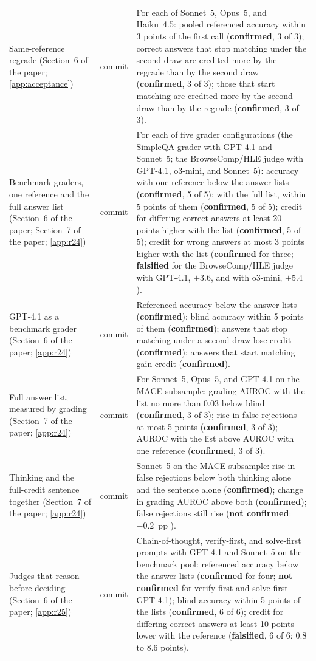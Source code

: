 {\begin{longtable}{L{3.2cm}L{1.1cm}L{8.7cm}}
Same-reference regrade (Section~6 of the paper; \cref{app:acceptance}) & commit & For each of Sonnet~5, Opus~5, and Haiku~4.5: pooled referenced accuracy within 3 points of the first call (\textbf{confirmed}, 3 of 3); correct answers that stop matching under the second draw are credited more by the regrade than by the second draw (\textbf{confirmed}, 3 of 3); those that start matching are credited more by the second draw than by the regrade (\textbf{confirmed}, 3 of 3). \\
Benchmark graders, one reference and the full answer list (Section~6 of the paper; Section~7 of the paper; \cref{app:r24}) & commit & For each of five grader configurations (the SimpleQA grader with GPT-4.1 and Sonnet~5; the BrowseComp/HLE judge with GPT-4.1, o3-mini, and Sonnet~5): accuracy with one reference below the answer lists (\textbf{confirmed}, 5 of 5); with the full list, within 5 points of them (\textbf{confirmed}, 5 of 5); credit for differing correct answers at least 20 points higher with the list (\textbf{confirmed}, 5 of 5); credit for wrong answers at most 3 points higher with the list (\textbf{confirmed} for three; \textbf{falsified} for the BrowseComp/HLE judge with GPT-4.1, $+3.6$, and with o3-mini, $+5.4$). \\
GPT-4.1 as a benchmark grader (Section~6 of the paper; \cref{app:r24}) & commit & Referenced accuracy below the answer lists (\textbf{confirmed}); blind accuracy within 5 points of them (\textbf{confirmed}); answers that stop matching under a second draw lose credit (\textbf{confirmed}); answers that start matching gain credit (\textbf{confirmed}). \\
Full answer list, measured by grading (Section~7 of the paper; \cref{app:r24}) & commit & For Sonnet~5, Opus~5, and GPT-4.1 on the \textsc{MACE} subsample: grading AUROC with the list no more than 0.03 below blind (\textbf{confirmed}, 3 of 3); rise in false rejections at most 5 points (\textbf{confirmed}, 3 of 3); AUROC with the list above AUROC with one reference (\textbf{confirmed}, 3 of 3). \\
Thinking and the full-credit sentence together (Section~7 of the paper; \cref{app:r24}) & commit & Sonnet~5 on the \textsc{MACE} subsample: rise in false rejections below both thinking alone and the sentence alone (\textbf{confirmed}); change in grading AUROC above both (\textbf{confirmed}); false rejections still rise (\textbf{not confirmed}: $-0.2$~pp ). \\
Judges that reason before deciding (Section~6 of the paper; \cref{app:r25}) & commit & Chain-of-thought, verify-first, and solve-first prompts with GPT-4.1 and Sonnet~5 on the benchmark pool: referenced accuracy below the answer lists (\textbf{confirmed} for four; \textbf{not confirmed} for verify-first and solve-first GPT-4.1); blind accuracy within 5 points of the lists (\textbf{confirmed}, 6 of 6); credit for differing correct answers at least 10 points lower with the reference (\textbf{falsified}, 6 of 6: 0.8 to 8.6 points). \\

\end{longtable}}
